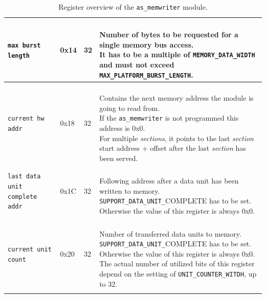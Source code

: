 \begin{longtable}[ht]{|l|l|l|l|}
    \texttt{max burst length} & 0x14 & 32 & \parbox{7cm}{\ \\
        Number of bytes to be requested for a single memory bus access.\\
        It has to be a multiple of \texttt{MEMORY\_DATA\_WIDTH} and must not exceed \texttt{MAX\_PLATFORM\_BURST\_LENGTH}.\\
    }\\
    \hline
    
    \texttt{current hw addr} & 0x18 & 32 & \parbox{7cm}{\ \\
        Contains the next memory address the module is going to read from.\\
        If the \texttt{as\_memwriter} is not programmed this address is 0x0.\\
        For multiple \textit{sections}, it points to the last \textit{section} start address + offset after the last \textit{section} has been served.\\
    }\\
    \hline
    
    \parbox{3cm}{\texttt{last data unit complete addr}} & 0x1C & 32 & \parbox{7cm}{\ \\
        Following address after a data unit has been written to memory.\\
        \texttt{SUPPORT\_DATA\_UNIT\_}\small{COMPLETE} has to be set. Otherwise the value of this register is always 0x0.\\
    }\\
    \hline
    
    \texttt{current unit count} & 0x20 & 32 & \parbox{7cm}{\ \\
        Number of transferred data units to memory.\\
        \texttt{SUPPORT\_DATA\_UNIT\_}\small{COMPLETE} has to be set. Otherwise the value of this register is always 0x0.\\
        The actual number of utilized bits of this register depend on the setting of \texttt{UNIT\_COUNTER\_WITDH}, up to 32.
    }\\
    \hline
    
    \caption{Register overview of the \texttt{as\_memwriter} module.}
\end{longtable}


